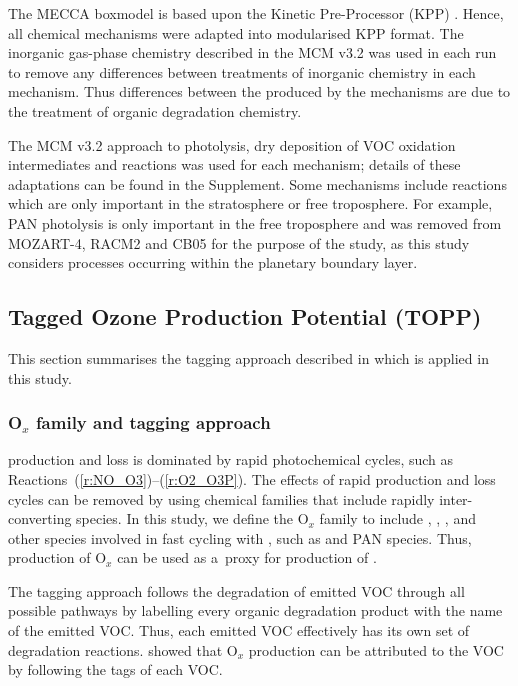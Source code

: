 \documentclass[acpd, online, hvmath]{copernicus}
\begin{document}
The MECCA boxmodel is based upon the Kinetic Pre-Processor (KPP)
\citep{Damian:2002}.  Hence, all chemical mechanisms were adapted into
modularised KPP format.  The inorganic gas-phase chemistry described
in the MCM v3.2 was used in each run to remove any differences between
treatments of inorganic chemistry in each mechanism.  Thus differences
between the  produced by the mechanisms are due to the
treatment of organic degradation chemistry.

The MCM v3.2 approach to photolysis, dry deposition of VOC oxidation
intermediates and  reactions was used for each
mechanism; details of these adaptations can be found in the Supplement.  Some mechanisms include reactions which are
only important in the stratosphere or free troposphere.  For example,
PAN photolysis is only important in the free troposphere
\citep{Harwood:2003} and was removed from MOZART-4, RACM2 and CB05 for
the purpose of the study, as this study considers processes occurring
within the planetary boundary layer.


\subsection{Tagged Ozone Production Potential (TOPP)}

This section summarises the tagging approach described in \citet{Butler:2011} which is applied in this study.

\subsubsection{O$_{x}$ family and tagging approach}
\label{ss:tagging}

 production and loss is dominated by rapid photochemical
cycles, such as Reactions~(\ref{r:NO_O3})--(\ref{r:O2_O3P}).  The
effects of rapid production and loss cycles can be removed by using
chemical families that include rapidly inter-converting species.  In
this study, we define the O$_{x}$ family to include ,
, ,  and other species involved
in fast cycling with , such as  and PAN
species.  Thus, production of O$_{x}$ can be used as a~proxy for
production of .

The tagging approach follows the degradation of emitted VOC through
all possible pathways by labelling every organic degradation product
with the name of the emitted VOC.  Thus, each emitted VOC effectively
has its own set of degradation reactions.  \citet{Butler:2011} showed
that O$_{x}$ production can be attributed to the VOC by following
the tags of each VOC.
\end{document}
